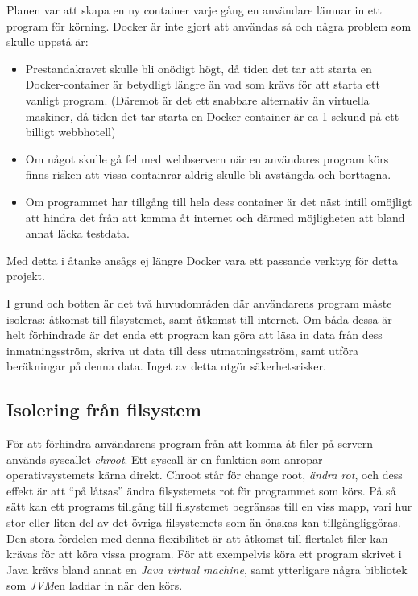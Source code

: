 \documentclass{article}
\begin{document}
Planen var att skapa en ny container varje gång en användare lämnar in ett
program för körning. Docker är inte gjort att användas så och några problem som
skulle uppstå är:
\begin{itemize}
	\item Prestandakravet skulle bli onödigt högt, då tiden det tar att starta
		en Docker-container är betydligt längre än vad som krävs för att starta
		ett vanligt program. (Däremot är det ett snabbare alternativ än
		virtuella maskiner, då tiden det tar starta en Docker-container är ca
		1 sekund på ett billigt webbhotell)
	\item Om något skulle gå fel med webbservern när en användares program körs
		finns risken att vissa containrar aldrig skulle bli avstängda och
		borttagna.
	\item Om programmet har tillgång till hela dess container är det näst
		intill omöjligt att hindra det från att komma åt internet och därmed
		möjligheten att bland annat läcka testdata.
\end{itemize}
Med detta i åtanke ansågs ej längre Docker vara ett passande verktyg för detta
projekt.

I grund och botten är det två huvudområden där användarens program måste
isoleras: åtkomst till filsystemet, samt åtkomst till internet. Om båda dessa är
helt förhindrade är det enda ett program kan göra att läsa in data från dess
inmatningsström, skriva ut data till dess utmatningsström, samt utföra
beräkningar på denna data. Inget av detta utgör säkerhetsrisker.

\subsection{Isolering från filsystem}

För att förhindra användarens program från att komma åt filer på servern används
syscallet \textit{chroot}. Ett syscall är en funktion som anropar
operativsystemets kärna direkt. Chroot står för change root,
\textit{ändra rot}, och dess effekt är att ``på låtsas'' ändra filsystemets rot
för programmet som körs. På så sätt kan ett programs tillgång till filsystemet
begränsas till en viss mapp, vari hur stor eller liten del av det övriga
filsystemets som än önskas kan tillgängliggöras. Den stora fördelen med denna
flexibilitet är att åtkomst till flertalet filer kan krävas för att köra vissa
program. För att exempelvis köra ett program skrivet i Java krävs bland annat en
\textit{Java virtual machine}, samt ytterligare några bibliotek som
\textit{JVM}en laddar in när den körs.
\end{document}

